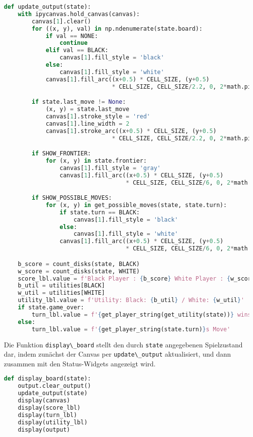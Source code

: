 \begin{lstlisting}[language=Python]
def update_output(state):
    with ipycanvas.hold_canvas(canvas):
        canvas[1].clear()
        for ((x, y), val) in np.ndenumerate(state.board):
            if val == NONE:
                continue
            elif val == BLACK:
                canvas[1].fill_style = 'black'
            else:
                canvas[1].fill_style = 'white'
            canvas[1].fill_arc((x+0.5) * CELL_SIZE, (y+0.5)
                               * CELL_SIZE, CELL_SIZE/2.2, 0, 2*math.pi)

        if state.last_move != None:
            (x, y) = state.last_move
            canvas[1].stroke_style = 'red'
            canvas[1].line_width = 2
            canvas[1].stroke_arc((x+0.5) * CELL_SIZE, (y+0.5)
                               * CELL_SIZE, CELL_SIZE/2.2, 0, 2*math.pi)

        if SHOW_FRONTIER:
            for (x, y) in state.frontier:
                canvas[1].fill_style = 'gray'
                canvas[1].fill_arc((x+0.5) * CELL_SIZE, (y+0.5)
                                   * CELL_SIZE, CELL_SIZE/6, 0, 2*math.pi)

        if SHOW_POSSIBLE_MOVES:
            for (x, y) in get_possible_moves(state, state.turn):
                if state.turn == BLACK:
                    canvas[1].fill_style = 'black'
                else:
                    canvas[1].fill_style = 'white'
                canvas[1].fill_arc((x+0.5) * CELL_SIZE, (y+0.5)
                                   * CELL_SIZE, CELL_SIZE/6, 0, 2*math.pi)

    b_score = count_disks(state, BLACK)
    w_score = count_disks(state, WHITE)
    score_lbl.value = f'Black Player : {b_score} White Player : {w_score}'
    b_util = utilities[BLACK]
    w_util = utilities[WHITE]
    utility_lbl.value = f'Utility: Black: {b_util} / White: {w_util}'
    if state.game_over:
        turn_lbl.value = f'{get_player_string(get_utility(state))} wins'
    else:
        turn_lbl.value = f'{get_player_string(state.turn)}s Move'
\end{lstlisting}

Die Funktion \passthrough{\lstinline!display\_board!} stellt den durch
\passthrough{\lstinline!state!} angegebenen Spielzustand dar, indem
zunächst der Canvas per \passthrough{\lstinline!update\_output!}
aktualisiert, und dann zusammen mit den Status-Widgets angezeigt wird.

\begin{lstlisting}[language=Python]
def display_board(state):
    output.clear_output()
    update_output(state)
    display(canvas)
    display(score_lbl)
    display(turn_lbl)
    display(utility_lbl)
    display(output)
\end{lstlisting}

